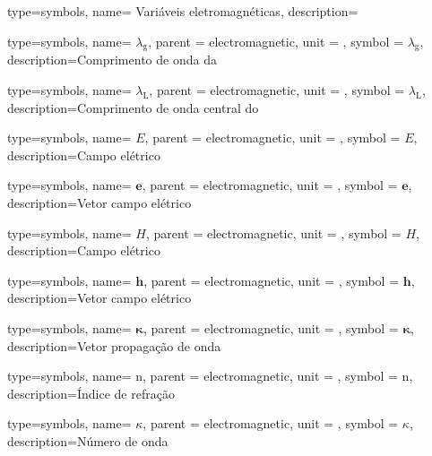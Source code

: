 {type=symbols,
    name= {Variáveis eletromagnéticas},
    description={}
}

{type=symbols,
    name= \ensuremath{\lambda_\text{g}},
    parent = {electromagnetic},
    unit = \unexpanded{\si{\meter}},
    symbol = \ensuremath{\lambda_\text{g}},
    description={Comprimento de onda da }
}


{type=symbols,
    name= \ensuremath{\lambda_\text{L}},
    parent = {electromagnetic},
    unit = \unexpanded{\si{\meter}},
    symbol = \ensuremath{\lambda_\text{L}},
    description={Comprimento de onda central do }
}



{type=symbols,
    name= \ensuremath{E},
    parent = {electromagnetic},
    unit = \unexpanded{\si{\volt\per\meter}},
    symbol = \ensuremath{E},
    description={Campo elétrico}
}

{type=symbols,
    name= \ensuremath{\mathbf{e}},
    parent = {electromagnetic},
    unit = \unexpanded{\si{\volt\per\meter}},
    symbol = \ensuremath{\mathbf{e}},
    description={Vetor campo elétrico}
}


{type=symbols,
    name= \ensuremath{H},
    parent = {electromagnetic},
    unit = \unexpanded{\si{\ampere\per\meter}},
    symbol = \ensuremath{H},
    description={Campo elétrico}
}

{type=symbols,
    name= \ensuremath{\mathbf{h}},
    parent = {electromagnetic},
    unit = \unexpanded{\si{\ampere\per\meter}},
    symbol = \ensuremath{\mathbf{h}},
    description={Vetor campo elétrico}
}

{type=symbols,
    name= \ensuremath{\boldsymbol{\kappa}},
    parent = {electromagnetic},
    unit = \unexpanded{\si{\per\meter}},
    symbol = \ensuremath{\boldsymbol{\kappa}},
    description={Vetor propagação de onda}
}


{type=symbols,
    name= \ensuremath{\mathrm{n}},
    parent = {electromagnetic},
    unit = \unexpanded{},
    symbol = \ensuremath{\mathrm{n}},
    description={Índice de refração}
}

{type=symbols,
    name= \ensuremath{\kappa},
    parent = {electromagnetic},
    unit = \unexpanded{\si{\radian\per\meter}},
    symbol = \ensuremath{\kappa},
    description={Número de onda}
}

